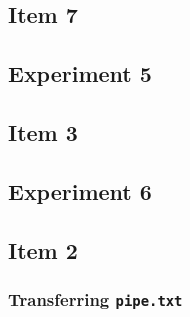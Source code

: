 \documentclass[a4paper, 11pt]{report}
\begin{document}
\begin{landscape}
\setcounter{subsection}{6}
\subsection{Item 7}


\end{landscape}

\begin{landscape}
\section{Experiment 5}
\setcounter{subsection}{2}
\subsection{Item 3}


\end{landscape}

\begin{landscape}
\section{Experiment 6}

\setcounter{subsection}{1}
\subsection{Item 2}
\subsubsection{Transferring \texttt{pipe.txt}}


\end{landscape}
\end{document}
